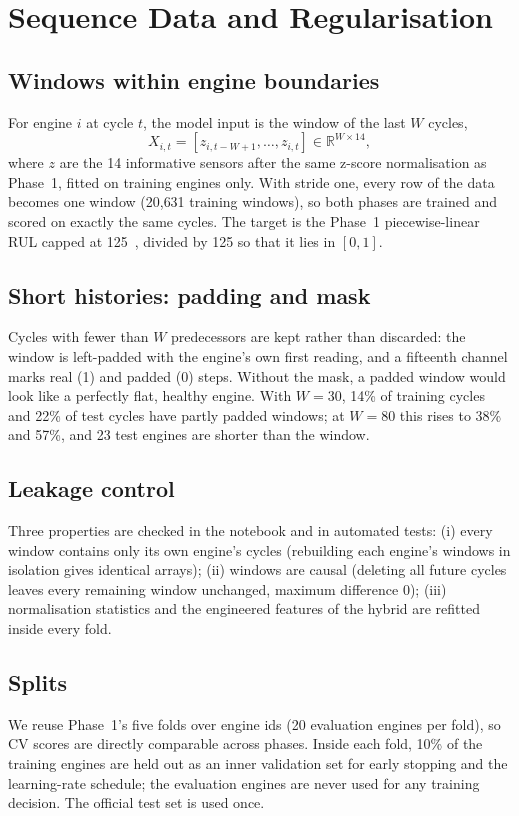 \section{Sequence Data and Regularisation}\label{sec:data}
\subsection{Windows within engine boundaries}
For engine $i$ at cycle $t$, the model input is the window of the last $W$ cycles,
\begin{equation}
  X_{i,t}=\left[z_{i,t-W+1},\dots,z_{i,t}\right]\in\mathbb{R}^{W\times 14},
\end{equation}
where $z$ are the 14 informative sensors after the same z-score normalisation as Phase~1, fitted on training engines only. With stride one, every row of the data becomes one window (20{,}631 training windows), so both phases are trained and scored on exactly the same cycles. The target is the Phase~1 piecewise-linear RUL capped at 125~\cite{heimes2008rnn}, divided by 125 so that it lies in $[0,1]$.

\subsection{Short histories: padding and mask}
Cycles with fewer than $W$ predecessors are kept rather than discarded: the window is left-padded with the engine's own first reading, and a fifteenth channel marks real (1) and padded (0) steps. Without the mask, a padded window would look like a perfectly flat, healthy engine. With $W=30$, 14\% of training cycles and 22\% of test cycles have partly padded windows; at $W=80$ this rises to 38\% and 57\%, and 23 test engines are shorter than the window.

\subsection{Leakage control}
Three properties are checked in the notebook and in automated tests: (i) every window contains only its own engine's cycles (rebuilding each engine's windows in isolation gives identical arrays); (ii) windows are causal (deleting all future cycles leaves every remaining window unchanged, maximum difference $0$); (iii) normalisation statistics and the engineered features of the hybrid are refitted inside every fold.

\subsection{Splits}
We reuse Phase~1's five folds over engine ids (20 evaluation engines per fold), so CV scores are directly comparable across phases. Inside each fold, 10\% of the training engines are held out as an inner validation set for early stopping and the learning-rate schedule; the evaluation engines are never used for any training decision. The official test set is used once.

